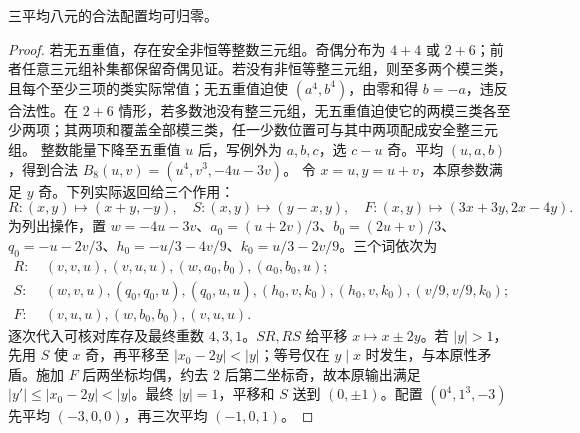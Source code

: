\begin{lemma}\label{lem:eight}
三平均八元的合法配置均可归零。
\end{lemma}
\begin{proof}
若无五重值，存在安全非恒等整数三元组。奇偶分布为 $4+4$ 或 $2+6$；前者任意三元组补集都保留奇偶见证。若没有非恒等整三元组，则至多两个模三类，且每个至少三项的类实际常值；无五重值迫使 $(a^4,b^4)$，由零和得 $b=-a$，违反合法性。在 $2+6$ 情形，若多数池没有整三元组，无五重值迫使它的两模三类各至少两项；其两项和覆盖全部模三类，任一少数位置可与其中两项配成安全整三元组。
整数能量下降至五重值 $u$ 后，写例外为 $a,b,c$，选 $c-u$ 奇。平均 $(u,a,b)$，得到合法 $B_8(u,v)=(u^4,v^3,-4u-3v)$。
令 $x=u,y=u+v$，本原参数满足 $y$ 奇。下列实际返回给三个作用：
\[
R:(x,y)\mapsto(x+y,-y),\quad
S:(x,y)\mapsto(y-x,y),\quad
F:(x,y)\mapsto(3x+3y,2x-4y).
\]
为列出操作，置 $w=-4u-3v$、$a_0=(u+2v)/3$、$b_0=(2u+v)/3$、$q_0=-u-2v/3$、$h_0=-u/3-4v/9$、$k_0=u/3-2v/9$。三个词依次为
\begin{align*}
R:&\ (v,v,u),(v,u,u),(w,a_0,b_0),(a_0,b_0,u);\\
S:&\ (w,v,u),(q_0,q_0,u),(q_0,u,u),
(h_0,v,k_0),(h_0,v,k_0),(v/9,v/9,k_0);\\
F:&\ (v,u,u),(w,b_0,b_0),(v,u,u).
\end{align*}
逐次代入可核对库存及最终重数 $4,3,1$。$SR,RS$ 给平移 $x\mapsto x\pm2y$。若 $|y|>1$，先用 $S$ 使 $x$ 奇，再平移至 $|x_0-2y|<|y|$；等号仅在 $y\mid x$ 时发生，与本原性矛盾。施加 $F$ 后两坐标均偶，约去 $2$ 后第二坐标奇，故本原输出满足 $|y'|\le|x_0-2y|<|y|$。最终 $|y|=1$，平移和 $S$ 送到 $(0,\pm1)$。配置 $(0^4,1^3,-3)$ 先平均 $(-3,0,0)$，再三次平均 $(-1,0,1)$。
\end{proof}

